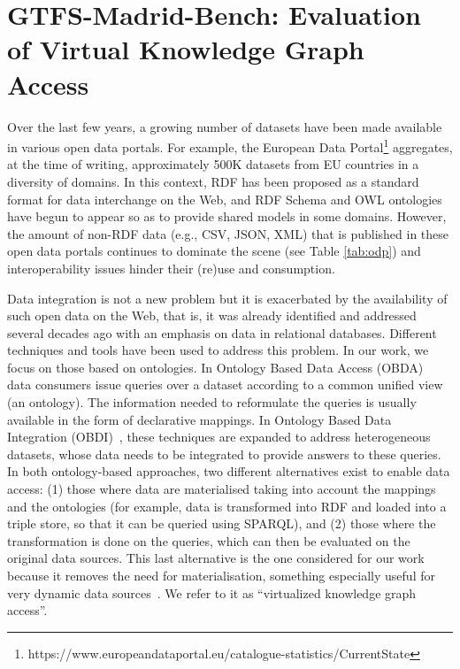 
\chapter{GTFS-Madrid-Bench: Evaluation of Virtual Knowledge Graph Access}


Over the last few years, a growing number of datasets have been made available in various open data portals. For example, the European Data Portal\footnote{https://www.europeandataportal.eu/catalogue-statistics/CurrentState} aggregates, at the time of writing, approximately 500K datasets from EU countries in a diversity of domains. In this context, RDF has been proposed as a standard format for data interchange on the Web, and RDF Schema and OWL ontologies have begun to appear so as to provide shared models in some domains. However, the amount of non-RDF data (e.g., CSV, JSON, XML) that is published in these open data portals continues to dominate the scene (see Table \ref{tab:odp}) and interoperability issues hinder their (re)use and consumption. 

Data integration is not a new problem but it is exacerbated by the availability of such open data on the Web, that is, it was already identified and addressed several decades ago with an emphasis on data in relational databases. Different techniques and tools have been used to address this problem. In our work, we focus on those based on ontologies. In Ontology Based Data Access (OBDA)~\citep{poggi2008linking} data consumers issue queries over a dataset according to a common unified view (an ontology). The information needed to reformulate the queries is usually available in the form of declarative mappings. In Ontology Based Data Integration (OBDI)~\citep{poggi2008linking}, these techniques are expanded to address heterogeneous datasets, whose data needs to be integrated to provide answers to these queries. In both ontology-based approaches, two different alternatives exist to enable data access: (1) those where data are materialised taking into account the mappings and the ontologies (for example, data is transformed into RDF and loaded into a triple store, so that it can be queried using SPARQL), and (2) those where the transformation is done on the queries, which can then be evaluated on the original data sources. This last alternative is the one considered for our work because it removes the need for materialisation, something especially useful for very dynamic data sources~\citep{corcho2019towards}. We refer to it as ``virtualized knowledge graph access''.

